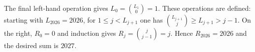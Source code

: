 The final left-hand operation gives $L_0=\binom{L_1}0=1$. These operations are defined: starting with $L_{2026}=2026$, for $1\le j<L_{j+1}$ one has $\binom{L_{j+1}}j\ge L_{j+1}>j-1$.
On the right, $R_0=0$ and induction gives $R_j=\binom j{j-1}=j$. Hence $R_{2026}=2026$ and the desired sum is $\boxed{2027}$.
